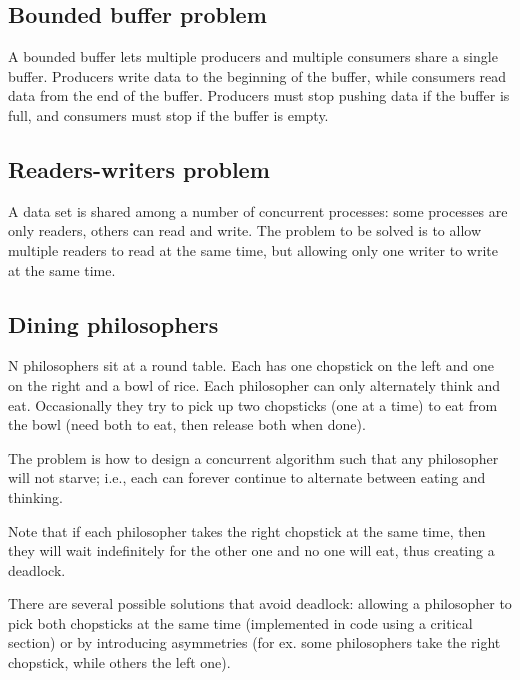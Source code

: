 \subsection{Bounded buffer problem}
A bounded buffer lets multiple producers and multiple consumers share a single buffer. Producers write data to the beginning of the buffer, while consumers read data from the end of the buffer. Producers must stop pushing data if the buffer is full, and consumers must stop if the buffer is empty.


\subsection{Readers-writers problem}
A data set is shared among a number of concurrent processes: some processes are only readers, others can read and write. The problem to be solved is to allow multiple readers to read at the same time, but allowing only one writer to write at the same time.



\subsection{Dining philosophers}
N philosophers sit at a round table. Each has one chopstick on the left and one on the right and a bowl of rice. Each philosopher can only alternately think and eat. Occasionally they try to pick up two chopsticks (one at a time) to eat from the bowl (need both to eat, then release both when done). 

The problem is how to design a concurrent algorithm such that any philosopher will not starve; i.e., each can forever continue to alternate between eating and thinking.

Note that if each philosopher takes the right chopstick at the same time, then they will wait indefinitely for the other one and no one will eat, thus creating a deadlock.

There are several possible solutions that avoid deadlock: allowing a philosopher to pick both chopsticks at the same time (implemented in code using a critical section) or by introducing asymmetries (for ex. some philosophers take the right chopstick, while others the left one).

